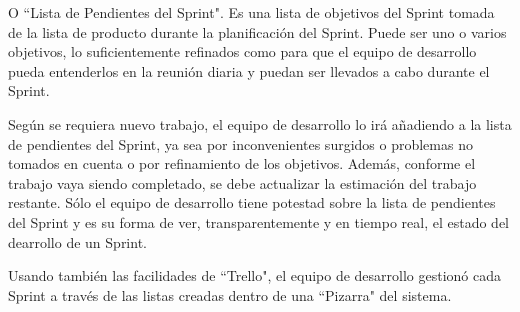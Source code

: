         O ``Lista de Pendientes del Sprint". Es una lista de objetivos del Sprint tomada de la lista de producto durante la planificación del Sprint. Puede ser uno o varios objetivos, lo suficientemente refinados como para que el equipo de desarrollo pueda entenderlos en la reunión diaria y puedan ser llevados a cabo durante el Sprint.
        
        Según se requiera nuevo trabajo, el equipo de desarrollo lo irá añadiendo a la lista de pendientes del Sprint, ya sea por inconvenientes surgidos o problemas no tomados en cuenta o por refinamiento de los objetivos. Además, conforme el trabajo vaya siendo completado, se debe actualizar la estimación del trabajo restante. Sólo el equipo de desarrollo tiene potestad sobre la lista de pendientes del Sprint y es su forma de ver, transparentemente y en tiempo real, el estado del dearrollo de un Sprint.
        
        Usando también las facilidades de ``Trello", el equipo de desarrollo gestionó cada Sprint a través de las listas creadas dentro de una ``Pizarra" del sistema.
    
\pagebreak